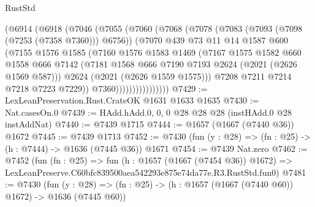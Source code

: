 \begin{lexlean}{RustStd}
\begin{coremodule}
                    (@6914
                      (@6918
                        (@7046
                          (@7055
                            (@7060
                              (@7068
                                (@7078
                                  (@7083 (@7093 (@7098 (@7253 (@7358 @7360))) @6756))
                                  (@7070
                                    @439
                                    @73
                                    @11
                                    @14
                                    @1587
                                    @600
                                    (@7155
                                      @1576
                                      @1585
                                      (@7160
                                        @1576
                                        @1583
                                        @1469
                                        (@7167
                                          @1575
                                          @1582
                                          @660
                                          @1558
                                          @666
                                          @7142
                                          (@7181
                                            @1568
                                            @666
                                            @7190
                                            @7193
                                            @2624
                                            (@2021 (@2626 @1569 @587)))
                                          @2624
                                          (@2021 (@2626 @1559 @1575)))
                                        @7208
                                        @7211
                                        @7214
                                        @7218
                                        @7223
                                        @7229))
                                    @7360))))))))))))))))
@7429 := LexLeanPreservation.Rust.CrateOK @1631 @1633 @1635
@7430 := Nat.casesOn.{0}
@7439 := HAdd.hAdd.{0, 0, 0} @28 @28 @28 (instHAdd.{0} @28 instAddNat)
@7440 := @7439 @1715
@7444 := @1657 (@1667 (@7440 @36)) @1672
@7445 := @7439 @1713
@7452 := @7430 (fun (y : @28) => (fn : @25) -> (h : @7444) -> @1636 (@7445 @36)) @1671
@7454 := @7439 Nat.zero
@7462 := @7452
    (fun (fn : @25) =>
    fun (h : @1657 (@1667 (@7454 @36)) @1672) =>
    LexLeanPreserve.C60bfc839500aea542293e875e74da77e.R3.RustStd.fun0)
@7481 := @7430
    (fun (y : @28) => (fn : @25) -> (h : @1657 (@1667 (@7440 @60)) @1672) -> @1636 (@7445 @60))

\end{coremodule}
\end{lexlean}
